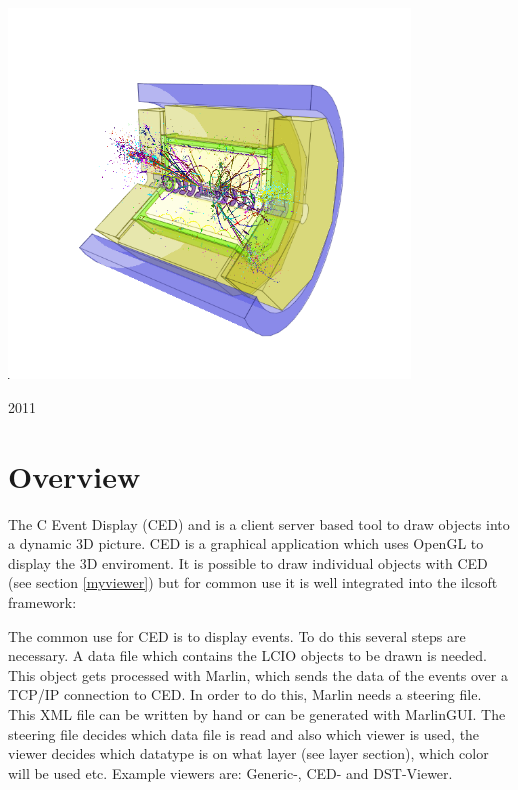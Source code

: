 \documentclass[a4paper,10pt]{article}
\begin{document}
\begin{titlepage}
\begin{center}
    \includegraphics[width=0.8\textwidth]{./title.png}\\[1cm]    
    \vfill

    {\large 2011}
    
\end{center}
\end{titlepage}
\newpage


\tableofcontents
\newpage
\section{Overview}
The C Event Display (CED) and is a client server based tool to draw objects into a dynamic 3D picture. 
CED is a graphical application which uses OpenGL to display the 3D enviroment. 
It is possible to draw individual objects with CED (see section \ref{myviewer}) but for common use it is well integrated into the ilcsoft framework:

The common use for CED is to display events. 
To do this several steps are necessary.
A data file which contains the LCIO objects to be drawn is needed. 
This object gets processed with Marlin, which sends the data of the events over a TCP/IP connection to CED. 
In order to do this, Marlin needs a steering file. 
This XML file can be written by hand or can be generated with MarlinGUI.
The steering file decides which data file is read and also which viewer is used, the viewer decides which datatype is on what layer (see layer section), which color will be used etc. Example viewers are: Generic-, CED- and DST-Viewer.
\end{document}
